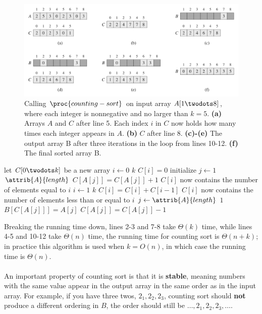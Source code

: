 \documentclass{article}
\begin{document}
\begin{figure}[!ht]
\includegraphics[scale=0.45]{counting_sort}
\caption{
    Calling $\proc{counting-sort}$ on input array $A[1 \twodots 8]$, where each integer is nonnegative and no larger than $k=5$.
    \textbf{(a)} Arrays $A$ and $C$ after line 5. Each index $i$ in $C$ now holds how many times each integer appears in $A$. 
    \textbf{(b)} $C$ after line 8.
    \textbf{(c)-(e)} The output array B after three iterations in the loop from lines 10-12.
    \textbf{(f)} The final sorted array B.
}
\label{fig:linear_cs}
\end{figure}

\begin{codebox}
\li let $C[0 \twodots k]$ be a new array
\li \For $i \gets 0$ \To $k$
\li \Do 
        $C[i] = 0$ \Comment initialize
    \End
\li \For $j \gets 1$ \To $\attrib{A}{length}$
\li \Do
        $C[A[j]] = C[A[j]] + 1$
    \End
\li \Comment $C[i]$ now contains the number of elements equal to $i$
\li \For $i \gets 1$ \To $k$
\li \Do
        $C[i] = C[i] + C[i-1]$
    \End
\li \Comment $C[i]$ now contains the number of elements less than or equal to $i$
\li \For $j \gets \attrib{A}{length}$ \Downto $1$
\li \Do
        $B[C[A[j]]] = A[j]$
\li    $C[A[j]] = C[A[j]] - 1$
    \End
\end{codebox}

Breaking the running time down, lines 2-3 and 7-8 take $\Theta{(k)}$ time, while lines 4-5 and 10-12 take $\Theta{(n)}$ time, the running time for counting sort is $\Theta{(n + k)}$; in practice this algorithm is used when $k = O(n)$, in which case the running time is $\Theta{(n)}$.
\\ \\
An important property of counting sort is that it is \textbf{stable}, meaning numbers with the same value appear in the output array in the same order as in the input array. For example, if you have three twos, $2_1, 2_2, 2_3$, counting sort should \textbf{not} produce a different ordering in $B$, the order should still be $\ldots, 2_1, 2_2, 2_3, \ldots$.
\end{document}
